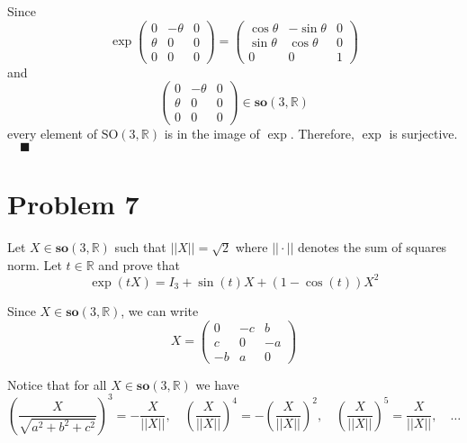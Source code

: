 \documentclass[12pt]{article}
\newcommand{\R}{\mathbb{R}}
\newcommand{\SO}{\text{SO}}
\newcommand{\norm}[1]{\left\vert \left\vert #1 \right\vert \right\vert}
\newcommand{\qed}{\quad \blacksquare}
\begin{document}
        Since 
        \[\exp\begin{pmatrix}
            0 & -\theta & 0\\ 
            \theta & 0 & 0\\ 
            0 & 0 & 0
        \end{pmatrix} = \begin{pmatrix}
            \cos \theta & -\sin \theta & 0\\ 
            \sin \theta & \cos \theta & 0\\ 
            0 & 0 & 1
        \end{pmatrix}\]
        and 
        \[\begin{pmatrix}
            0 & -\theta & 0\\ 
            \theta & 0 & 0\\ 
            0 & 0 & 0
        \end{pmatrix} \in \textbf{so}(3, \R)\]
        every element of $\SO(3, \R)$ is in the image of $\exp$. Therefore, $\exp$ is surjective. $\qed$
    \color{black}


\pagebreak
\section*{Problem 7} Let $X \in \textbf{so}(3,\R)$ such that $||X|| = \sqrt{2}$ where $||\cdot ||$ denotes the sum of squares norm. Let $t \in \R$ and prove that 
\[\exp(tX) = I_{3} + \sin(t)X + \left(1-\cos(t)\right)X^{2}\]

    \color{blue}
        Since $X \in \textbf{so}(3, \R)$, we can write 
        \[X = \begin{pmatrix}
            0 & -c & b\\ 
            c & 0 & -a\\
            -b & a & 0
        \end{pmatrix}\]

        Notice that for all $X \in \textbf{so}(3, \R)$ we have 
        \[\left(\frac{X}{\sqrt{a^2 + b^2 + c^2}}\right)^3 = -\frac{X}{\norm{X}}, \quad \left(\frac{X}{\norm{X}}\right)^4 = -\left(\frac{X}{\norm{X}}\right)^2, \quad \left(\frac{X}{\norm{X}}\right)^5 = \frac{X}{\norm{X}}, \quad \dots\]
        
\end{document}
